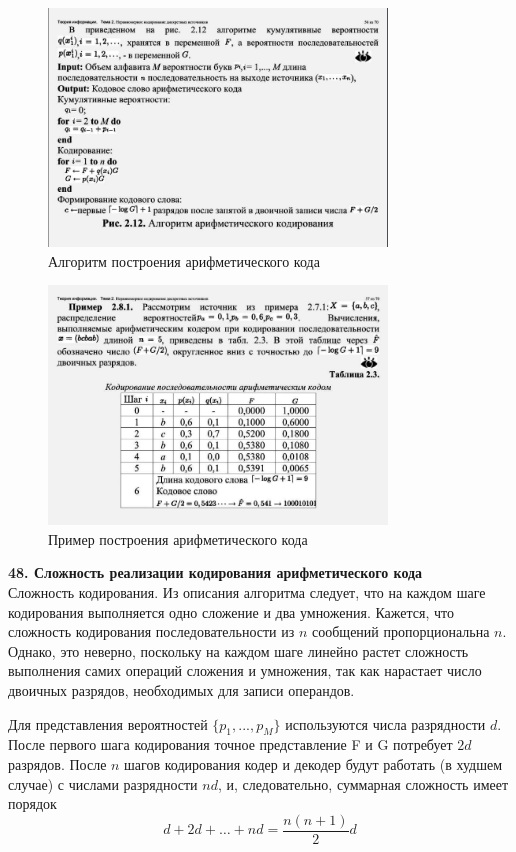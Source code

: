 \documentclass[14pt]{article}
\begin{document}
\begin{figure}[ht!]
\centering
    \includegraphics[width=90mm]{aryph_alg.png}
\caption{Алгоритм построения арифметического кода}
\end{figure}

\begin{figure}[pt]
\centering
    \includegraphics[width=90mm]{aryph_example.png}
\caption{Пример построения арифметического кода}
\end{figure}

\bigskip
\textbf{48. Сложность реализации кодирования арифметического кода} \\

Сложность кодирования. Из описания алгоритма следует, что на каждом шаге кодирования выполняется одно сложение и два умножения. Кажется, что сложность кодирования последовательности из \(n\) сообщений пропорциональна \(n\). Однако, это неверно, поскольку на каждом шаге линейно растет сложность выполнения самих операций сложения и умножения, так как нарастает число двоичных разрядов, необходимых для записи операндов.

Для представления вероятностей \(\{p_1,...,p_M\}\) используются числа разрядности \(d\). После первого шага кодирования точное представление F и G потребует \(2d\) разрядов. После \(n\) шагов кодирования кодер и декодер будут работать (в худшем случае) с числами разрядности \(nd\), и, следовательно, суммарная сложность имеет порядок
\begin{displaymath}
    d + 2d + \ldots + nd = \frac{n(n + 1)}{2}d
\end{displaymath}
\end{document}
